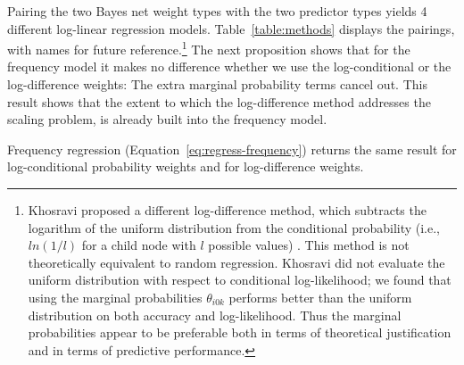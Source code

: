 \documentclass[twoside,leqno,twocolumn]{article}
\begin{document}
Pairing the two Bayes net weight types with the two predictor types yields 4 different log-linear regression models. Table~\ref{table:methods} displays the pairings, with names for future reference.\footnote{Khosravi proposed a different log-difference method, which subtracts the logarithm of the uniform distribution from the conditional probability (i.e., $ln(1/l)$ for a child node with $l$ possible values) \cite{Khosravi2012b}. This method is not theoretically equivalent to random regression. Khosravi did not evaluate the uniform distribution with respect to conditional log-likelihood; we found that using the marginal probabilities $\theta_{i0k}$ performs better than the uniform distribution on both accuracy and log-likelihood. Thus the marginal probabilities appear to be preferable both in terms of theoretical justification and in terms of predictive performance.} 
%
The next proposition shows that for the frequency model it makes no difference whether we use the log-conditional or the log-difference weights: The extra marginal probability terms cancel out. This result shows that the extent to which the log-difference method addresses the scaling problem, is already built into the frequency model.

\begin{table}[htdp]
\caption{Regression models + Bayes net weight conversion methods; the frequency models are mathematically equivalent to each other and to random regression.}
\begin{center}
\end{center}
\label{table:methods}
\end{table}%




\begin{proposition}
Frequency regression (Equation~\ref{eq:regress-frequency}) returns the same result for log-conditional probability weights and for log-difference weights.
\end{proposition}
\end{document}
